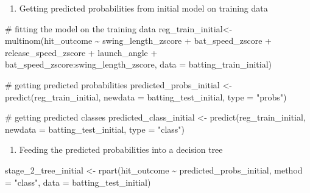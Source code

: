 \documentclass[
  letterpaper,
  DIV=11,
  numbers=noendperiod]{scrartcl}
\newenvironment{Shaded}{\begin{snugshade}}{\end{snugshade}}
\newcommand{\AttributeTok}[1]{\textcolor[rgb]{0.40,0.45,0.13}{#1}}
\newcommand{\CommentTok}[1]{\textcolor[rgb]{0.37,0.37,0.37}{#1}}
\newcommand{\FunctionTok}[1]{\textcolor[rgb]{0.28,0.35,0.67}{#1}}
\newcommand{\NormalTok}[1]{\textcolor[rgb]{0.00,0.23,0.31}{#1}}
\newcommand{\OtherTok}[1]{\textcolor[rgb]{0.00,0.23,0.31}{#1}}
\newcommand{\SpecialCharTok}[1]{\textcolor[rgb]{0.37,0.37,0.37}{#1}}
\newcommand{\StringTok}[1]{\textcolor[rgb]{0.13,0.47,0.30}{#1}}
\providecommand{\tightlist}{%
  \setlength{\itemsep}{0pt}\setlength{\parskip}{0pt}}\usepackage{longtable,booktabs,array}
\begin{document}
\begin{enumerate}
\def\labelenumi{\arabic{enumi}.}
\setcounter{enumi}{1}
\tightlist
\item
  Getting predicted probabilities from initial model on training data
\end{enumerate}

\begin{Shaded}
\begin{Highlighting}[]
\CommentTok{\# fitting the model on the training data }
\NormalTok{reg\_train\_initial}\OtherTok{\textless{}{-}} \FunctionTok{multinom}\NormalTok{(hit\_outcome }\SpecialCharTok{\textasciitilde{}}
\NormalTok{                          swing\_length\_zscore }\SpecialCharTok{+}
\NormalTok{                          bat\_speed\_zscore }\SpecialCharTok{+}
\NormalTok{                          release\_speed\_zscore }\SpecialCharTok{+}
\NormalTok{                          launch\_angle }\SpecialCharTok{+}
\NormalTok{                          bat\_speed\_zscore}\SpecialCharTok{:}\NormalTok{swing\_length\_zscore,}
                        \AttributeTok{data =}\NormalTok{ batting\_train\_initial)}

\CommentTok{\# getting predicted probabilities }
\NormalTok{predicted\_probs\_initial }\OtherTok{\textless{}{-}} \FunctionTok{predict}\NormalTok{(reg\_train\_initial,}
                           \AttributeTok{newdata =}\NormalTok{ batting\_test\_initial,}
                           \AttributeTok{type =} \StringTok{"probs"}\NormalTok{)}

\CommentTok{\# getting predicted classes }
\NormalTok{predicted\_class\_initial }\OtherTok{\textless{}{-}} \FunctionTok{predict}\NormalTok{(reg\_train\_initial,}
                           \AttributeTok{newdata =}\NormalTok{ batting\_test\_initial,}
                           \AttributeTok{type =} \StringTok{"class"}\NormalTok{)}
\end{Highlighting}
\end{Shaded}

\begin{enumerate}
\def\labelenumi{\arabic{enumi}.}
\setcounter{enumi}{2}
\tightlist
\item
  Feeding the predicted probabilities into a decision tree
\end{enumerate}

\begin{Shaded}
\begin{Highlighting}[]
\NormalTok{stage\_2\_tree\_initial }\OtherTok{\textless{}{-}} \FunctionTok{rpart}\NormalTok{(hit\_outcome }\SpecialCharTok{\textasciitilde{}}
\NormalTok{                        predicted\_probs\_initial,}
                      \AttributeTok{method =} \StringTok{"class"}\NormalTok{,}
                      \AttributeTok{data =}\NormalTok{ batting\_test\_initial)}
\end{Highlighting}
\end{Shaded}
\end{document}
